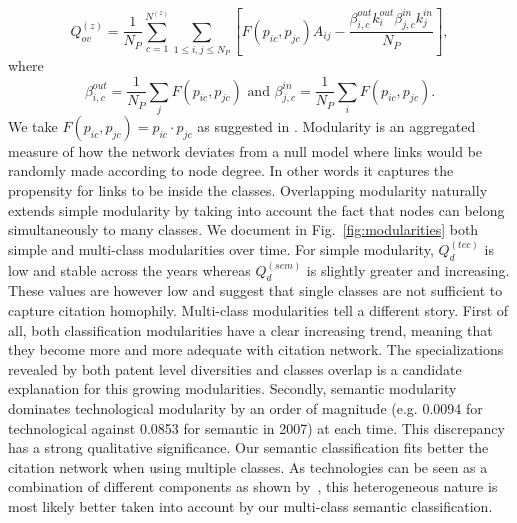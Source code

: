 \documentclass[12pt,twoside,a4paper]{article}
\begin{document}
\[
\displaystyle Q_{ov}^{(z)} = \frac{1}{N_P} \sum_{c = 1}^{N^{(z)}} \sum_{1\leq i,j \leq N_P}\left[F(p_{ic},p_{jc})A_{ij} - \frac{\beta_{i,c}^{out}k_i^{out}\beta_{j,c}^{in}k_j^{in}}{N_P}\right],
\]
where
\[
 \beta_{i,c}^{out} =   \frac{1}{N_P} \displaystyle \sum_j F(p_{ic},p_{jc}) \text{ and } \beta_{j,c}^{in} =  \frac{1}{N_P} \displaystyle \sum_i F(p_{ic},p_{jc}).
\]
We take $F(p_{ic},p_{jc}) = p_{ic}\cdot p_{jc}$ as suggested in \cite{nicosia2009extending}. Modularity is an aggregated measure of how the network deviates from a null model where links would be randomly made according to node degree. In other words it captures the propensity for links to be inside the classes. Overlapping modularity naturally extends simple modularity by taking into account the fact that nodes can belong simultaneously to many classes.
We document in Fig.~\ref{fig:modularities} both simple and multi-class modularities over time. For simple modularity, $Q_d^{(tec)}$ is low and stable across the years whereas $Q_d^{(sem)}$ is slightly greater and increasing. These values are however low and suggest that single classes are not sufficient to capture citation homophily. Multi-class modularities tell a different story. First of all, both classification modularities have a clear increasing trend, meaning that they become more and more adequate with citation network. The specializations revealed by both patent level diversities and classes overlap is a candidate explanation for this growing modularities. Secondly, semantic modularity dominates technological modularity by an order of magnitude (e.g. 0.0094 for technological against 0.0853 for semantic in 2007) at each time. This discrepancy has a strong qualitative significance. Our semantic classification fits better the citation network when using multiple classes. As technologies can be seen as a combination of different components as shown by~\cite{Youn:2015fk}, this heterogeneous nature is most likely better taken into account by our multi-class semantic classification.
\end{document}
